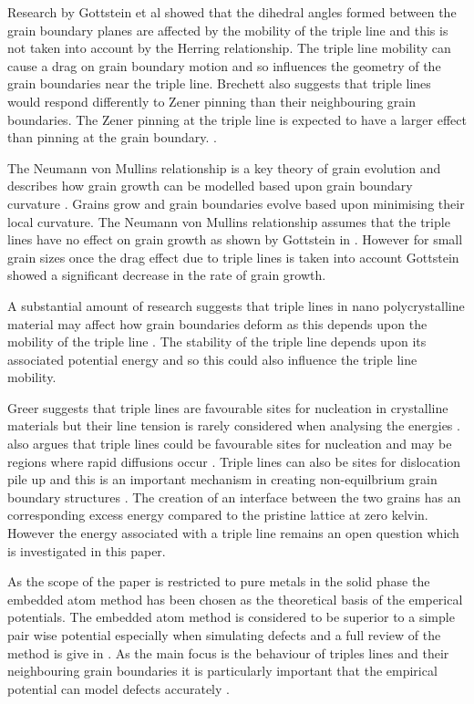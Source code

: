 \documentclass[12pt,a4paper,openany]{report}
\begin{document}
Research by Gottstein et al \cite{GOTTSTEIN2010914} showed that the dihedral angles formed between the grain boundary planes are affected by the mobility of the triple line and this is not taken into account by the Herring relationship. The triple line mobility can cause a drag on grain boundary motion and so influences the geometry of the grain boundaries near the triple line. Brechett also suggests that triple lines would respond differently to Zener pinning than their neighbouring grain boundaries. The Zener pinning at the triple line is expected to have a larger effect than pinning at the grain boundary. \cite{BRECHET2010910}.

The Neumann von Mullins relationship is a key theory of grain evolution and describes how grain growth can be modelled based upon grain boundary curvature \cite{Lazar2011}. Grains grow and grain boundaries evolve based upon minimising their local curvature. The Neumann von Mullins relationship assumes that the triple lines have no effect on grain growth as shown by Gottstein in \cite{GOTTSTEIN2010914}. However for small grain sizes once the drag effect due to triple lines is taken into account Gottstein showed a significant decrease in the rate of grain growth.

A substantial amount of research suggests that triple lines in nano polycrystalline material may affect how grain boundaries deform as this depends upon the mobility of the triple line \cite{Shvindlerman2005,BRECHET2010910, Fischer2012,
GOTTSTEIN2000, ZOLLNER201241, Miessen2015, Thomas2019}. The stability of the triple line depends upon its associated potential energy and so this could also influence the triple line mobility. 

Greer suggests that triple lines are favourable sites for nucleation in crystalline materials but their line tension is rarely considered when analysing the energies   \cite{GREER2010899}. \citeauthor{King2010} also argues that triple lines could be favourable sites for nucleation and may be   regions where rapid diffusions occur \cite{King2010}. Triple lines can also be sites for dislocation pile up and this is an important mechanism in creating non-equilbrium grain boundary structures \cite{Nazarov1993}. The creation of an interface between the two grains has an corresponding excess energy compared to the pristine lattice at zero kelvin. However the energy associated with a triple line remains an open question which is investigated in this paper.

As the scope of the paper is restricted to pure metals in the solid phase the embedded atom method has been chosen as the theoretical basis of the emperical potentials. The embedded atom method is considered to be superior to a simple pair wise potential especially when simulating defects and a full review of the method is give in \cite{Daw1993}. As the main focus is the behaviour of triples lines and their neighbouring grain boundaries it is particularly important that the empirical potential can model defects accurately . 
\end{document}
